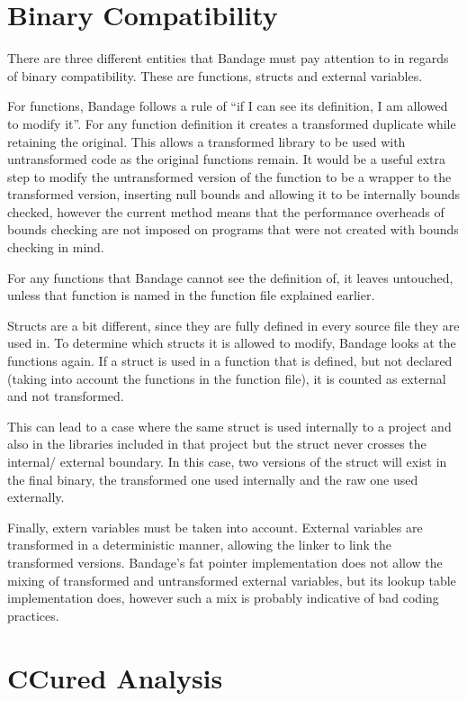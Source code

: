 \section{Binary Compatibility}
There are three different entities that Bandage must pay attention to in regards of binary compatibility.
These are functions, structs and external variables.

For functions, Bandage follows a rule of ``if I can see its definition, I am allowed to modify it''.
For any function definition it creates a transformed duplicate while retaining the original.
This allows a transformed library to be used with untransformed code as the original functions remain.
It would be a useful extra step to modify the untransformed version of the function to be a wrapper to the transformed version, inserting null bounds and allowing it to be internally bounds checked, however the current method means that the performance overheads of bounds checking are not imposed on programs that were not created with bounds checking in mind.

For any functions that Bandage cannot see the definition of, it leaves untouched, unless that function is named in the function file explained earlier.

Structs are a bit different, since they are fully defined in every source file they are used in.
To determine which structs it is allowed to modify, Bandage looks at the functions again.
If a struct is used in a function that is defined, but not declared (taking into account the functions in the function file), it is counted as external and not transformed.

This can lead to a case where the same struct is used internally to a project and also in the libraries included in that project but the struct never crosses the internal/ external boundary.
In this case, two versions of the struct will exist in the final binary, the transformed one used internally and the raw one used externally.

Finally, extern variables must be taken into account.
External variables are transformed in a deterministic manner, allowing the linker to link the transformed versions.
Bandage's fat pointer implementation does not allow the mixing of transformed and untransformed external variables, but its lookup table implementation does, however such a mix is probably indicative of bad coding practices.
\section{CCured Analysis}

